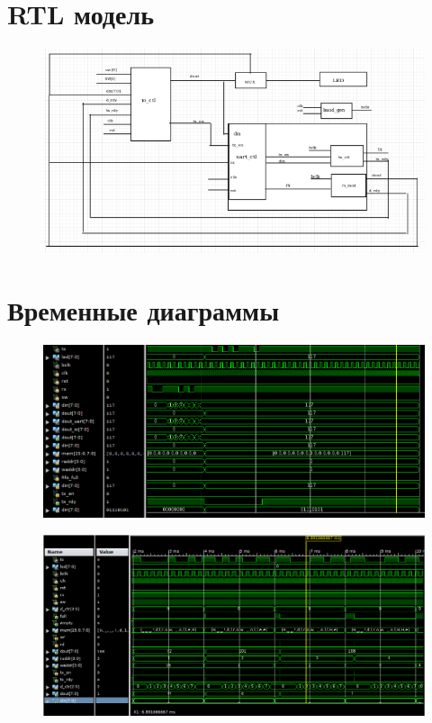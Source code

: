 \documentclass[a4paper, 10pt]{article}
\begin{document}
     \section*{RTL модель}
        \begin{figure}[h!]
            \includegraphics[scale=0.5]{../images/rtl.png}
        \end{figure}

     \section*{Временные диаграммы}
        \begin{figure}[h!]
            \includegraphics[scale=0.5]{../images/echo_mode.png}
        \end{figure}
        \begin{figure}[h!]
            \includegraphics[scale=0.5]{../images/transmission.png}
        \end{figure}
\end{document}
